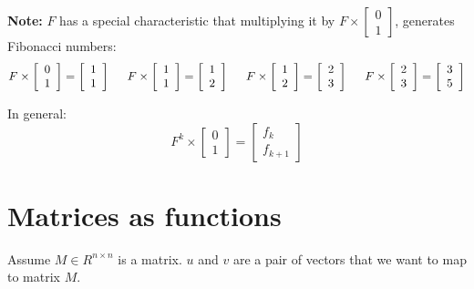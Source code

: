 \documentclass{article}
\begin{document}
\textbf{Note:} $F$ has a special characteristic that multiplying it by
    $F \times \left[ \begin{array}{cc}
        0 \\
        1
    \end{array} \right]$,
generates Fibonacci numbers: \\
\[ F \times  \left[ \begin{array}{cc}
0 \\
1
\end{array} \right]
%
= 
\left[ \begin{array}{cc}
1 \\
1
\end{array} \right]
\hspace{0.5 cm}
%
F \times \left[ \begin{array}{cc}
1 \\
1
\end{array} \right]
%
= \left[ \begin{array}{cc}
1 \\
2
\end{array} \right] \hspace{0.5 cm}
%
F \times \left[ \begin{array}{cc}
1 \\
2
\end{array} \right]
%
= \left[ \begin{array}{cc}
2 \\
3 
\end{array} \right] \hspace{0.5 cm}
%
F \times \left[ \begin{array}{cc}
2 \\
3
\end{array} \right]
%
= \left[ \begin{array}{cc}
3 \\
5 
\end{array} \right]\]

%
In general: \[F^k \times \left[ \begin{array}{cc}
0 \\
1
\end{array} \right]
%
= \left[ \begin{array}{cc}
f_k \\
f_{k+1} 
\end{array} \right]
\]

\section{Matrices as functions}
Assume $M \in R^{n\times n}$ is a matrix. $u$ and $v$ are a pair of vectors that we want to map to matrix $M$.
\end{document}
